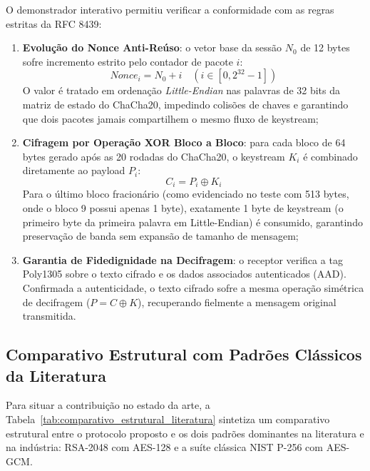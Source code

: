 O demonstrador interativo permitiu verificar a conformidade com as regras estritas da RFC 8439:
\begin{enumerate}
    \item \textbf{Evolução do Nonce Anti-Reúso}: o vetor base da sessão $N_0$ de 12 bytes sofre incremento estrito pelo contador de pacote $i$:
    \begin{equation}
        Nonce_i = N_0 + i \quad (i \in [0, 2^{32}-1])
    \end{equation}
    O valor é tratado em ordenação \textit{Little-Endian} nas palavras de 32 bits da matriz de estado do ChaCha20, impedindo colisões de chaves e garantindo que dois pacotes jamais compartilhem o mesmo fluxo de keystream;
    \item \textbf{Cifragem por Operação XOR Bloco a Bloco}: para cada bloco de 64 bytes gerado após as 20 rodadas do ChaCha20, o keystream $K_i$ é combinado diretamente ao payload $P_i$:
    \begin{equation}
        C_i = P_i \oplus K_i
    \end{equation}
    Para o último bloco fracionário (como evidenciado no teste com 513 bytes, onde o bloco 9 possui apenas 1 byte), exatamente 1 byte de keystream (o primeiro byte da primeira palavra em Little-Endian) é consumido, garantindo preservação de banda sem expansão de tamanho de mensagem;
    \item \textbf{Garantia de Fidedignidade na Decifragem}: o receptor verifica a tag Poly1305 sobre o texto cifrado e os dados associados autenticados (AAD). Confirmada a autenticidade, o texto cifrado sofre a mesma operação simétrica de decifragem ($P = C \oplus K$), recuperando fielmente a mensagem original transmitida.
\end{enumerate}

\subsection{Comparativo Estrutural com Padrões Clássicos da Literatura}
\label{subsec:comparativo_literatura}

Para situar a contribuição no estado da arte, a Tabela~\ref{tab:comparativo_estrutural_literatura} sintetiza um comparativo estrutural entre o protocolo proposto e os dois padrões dominantes na literatura e na indústria: RSA-2048 com AES-128 e a suíte clássica NIST P-256 com AES-GCM.

